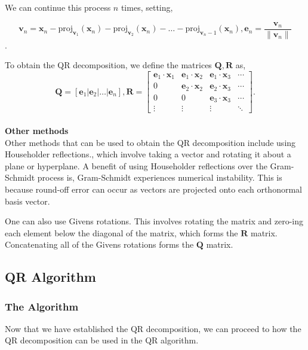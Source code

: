 \documentclass[onecolumn]{webofc}
\begin{document}
We can continue this process $n$ times,  setting,

$$\mathbf{v}_n = \mathbf{x}_n - \text{proj}_{\mathbf{v}_1}(\mathbf{x}_n) - \text{proj}_{\mathbf{v}_2}(\mathbf{x}_n)- \ldots - \text{proj}_{\mathbf{v}_n-1}(\mathbf{x}_n), \mathbf{e}_n = \frac{\mathbf{v}_n}{\|\mathbf{v}_n\|}$$.

To obtain the QR decomposition, we define the matrices $\mathbf{Q}, \mathbf{R}$ as,
$$\mathbf{Q} = [\mathbf{e}_1 | \mathbf{e}_2 | \ldots | \mathbf{e}_n], \mathbf{R} = \begin{bmatrix}
  \mathbf{e}_1 \cdot \mathbf{x}_1 &
  \mathbf{e}_1 \cdot \mathbf{x}_2 &
  \mathbf{e}_1 \cdot \mathbf{x}_3 & \cdots \\
                                         0 &
 \mathbf{e}_2 \cdot \mathbf{x}_2 &
 \mathbf{e}_2 \cdot \mathbf{x}_3& \cdots \\
                                         0 &
                                         0 &
  \mathbf{e}_3 \cdot \mathbf{x}_3& \cdots \\
                                    \vdots &
                                    \vdots &
                                    \vdots &
                                    \ddots\end{bmatrix}.$$
\\
\textbf{Other methods}
\\
Other methods that can be used to obtain the QR decomposition include using Householder reflections., which involve taking a vector and rotating it about a plane or hyperplane. A benefit of using Householder reflections over the Gram-Schmidt process is, Gram-Schmidt experiences numerical instability. This is because round-off error can occur as vectors are projected onto each orthonormal basis vector. 

One can also use Givens rotations. This involves rotating the matrix and zero-ing each element below the diagonal of the matrix, which forms the $\mathbf{R}$ matrix. Concatenating all of the Givens rotations forms the $\mathbf{Q}$ matrix.


\subsection{QR Algorithm}
\subsubsection*{The Algorithm}
Now that we have established the QR decomposition, we can proceed to how the QR decomposition can be used in the QR algorithm. 
\end{document}
